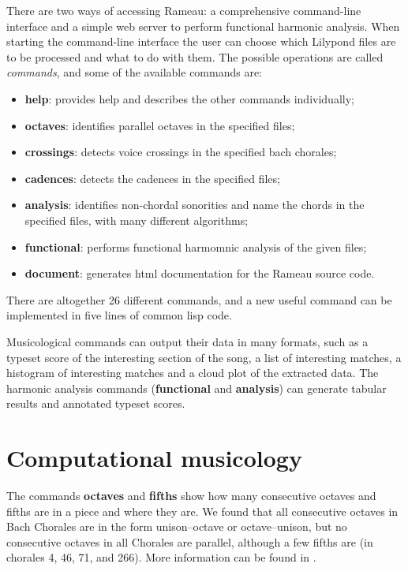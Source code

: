 \documentclass[a0paper]{sciposter}
\begin{document}
\begin{multicols}{3}
There are two ways of accessing Rameau: a comprehensive command-line
interface and a simple web server to perform functional harmonic
analysis. When starting the command-line interface the user can choose
which Lilypond files are to be processed and what to do with
them. The possible operations are called \textit{commands}, and some
of the available commands are:
\begin{itemize}
\item \textbf{help}: provides help and describes the other commands
  individually;
\item \textbf{octaves}: identifies parallel octaves in the specified files;
\item \textbf{crossings}: detects voice crossings in the specified
  bach chorales;
\item \textbf{cadences}: detects the cadences in the specified files;
\item \textbf{analysis}: identifies non-chordal sonorities and name
  the chords in the specified files, with many different algorithms;
\item \textbf{functional}: performs functional harmomnic analysis of
  the given files;
\item \textbf{document}: generates html documentation for the Rameau
  source code.
\end{itemize}
There are altogether 26 different commands, and a new useful command
can be implemented in five lines of common lisp code.

Musicological commands can output their data in many formats, such as
a typeset score of the interesting section of the song, a list of
interesting matches, a histogram of interesting matches and a cloud
plot of the extracted data. The harmonic analysis commands
(\textbf{functional} and \textbf{analysis}) can generate tabular
results and annotated typeset scores.

\section{Computational musicology}
\label{sec:comp-music}

The commands \textbf{octaves} and \textbf{fifths} show how many
consecutive octaves and fifths are in a piece and where they are. We
found that all consecutive octaves in Bach Chorales are in the form
unison--octave or octave--unison, but no consecutive octaves in all
Chorales are parallel, although a few fifths are (in chorales 4, 46,
71, and 266). More information can be found in
\cite{kroger08:musicologia}.



\end{multicols}
\end{document}
